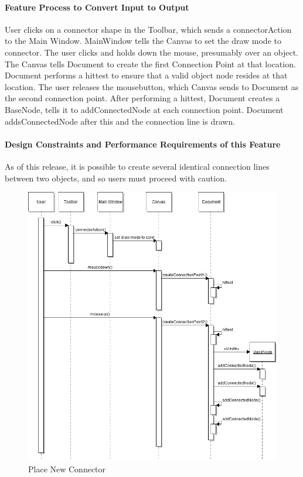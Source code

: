 \documentclass[twoside,letterpaper]{article}
\begin{document}
{\paragraph{Feature Process to Convert Input to Output}
{
User clicks on a connector shape in the Toolbar, which sends a connectorAction to the Main Window. MainWindow tells the Canvas to set the draw mode to connector. \newline
The user clicks and holds down the mouse, presumably over an object. The Canvas tells Document to create the first Connection Point at that location. Document performs a hittest to ensure that a valid object node resides at that location. \newline
The user releases the mousebutton, which Canvas sends to Document as the second connection point. After performing a hittest, Document creates a BaseNode, tells it to addConnectedNode at each connection point. Document addsConnectedNode after this and the connection line is drawn.
}

\paragraph{Design Constraints and Performance Requirements of this Feature}
{
As of this release, it is possible to create several identical connection lines between two objects, and so users must proceed with caution. 
}
\bigskip
\bigskip

\begin{figure}[h]
\centering
\includegraphics[width=5.0in]{IntNewConn.jpg}
\caption{Place New Connector}
\end{figure}

}
\end{document}
